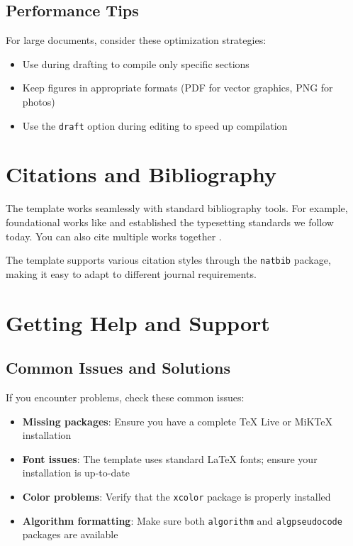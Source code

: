 \documentclass{triton}
\begin{document}
\subsection{Performance Tips}

For large documents, consider these optimization strategies:

\begin{itemize}
    \item Use \verb|| during drafting to compile only specific sections
    \item Keep figures in appropriate formats (PDF for vector graphics, PNG for photos)
    \item Use the \texttt{draft} option during editing to speed up compilation
\end{itemize}

\section{Citations and Bibliography}

The template works seamlessly with standard bibliography tools. For example, foundational works like \citet{lamport1994latex} and \citet{knuth1984texbook} established the typesetting standards we follow today. You can also cite multiple works together \citep{lamport1994latex,knuth1984texbook}.

The template supports various citation styles through the \texttt{natbib} package, making it easy to adapt to different journal requirements.

\section{Getting Help and Support}

\subsection{Common Issues and Solutions}

If you encounter problems, check these common issues:

\begin{itemize}
    \item \textbf{Missing packages}: Ensure you have a complete \TeX{} Live or MiK\TeX{} installation
    \item \textbf{Font issues}: The template uses standard \LaTeX{} fonts; ensure your installation is up-to-date
    \item \textbf{Color problems}: Verify that the \texttt{xcolor} package is properly installed
    \item \textbf{Algorithm formatting}: Make sure both \texttt{algorithm} and \texttt{algpseudocode} packages are available
\end{itemize}
\end{document}
